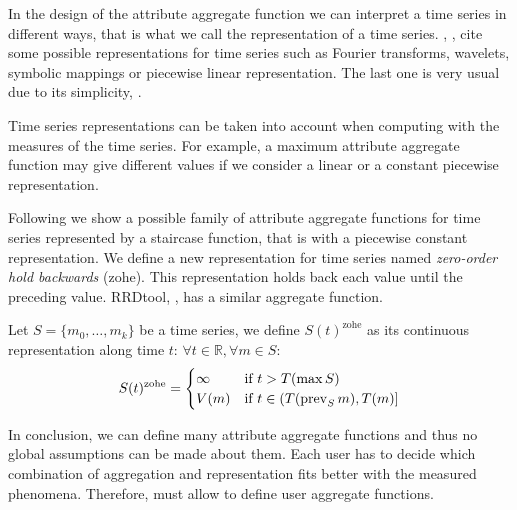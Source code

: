 
In the design of the attribute aggregate function we can interpret a
time series in different ways, that is what we call the representation
of a time series. \citeauthor{last:keogh}, \cite{last:keogh}, cite
some possible representations for time series such as Fourier
transforms, wavelets, symbolic mappings or piecewise linear
representation. The last one is very usual due to its simplicity,
\cite{keogh01}.

Time series representations can be taken into account when computing
with the measures of the time series.  For example, a maximum
attribute aggregate function may give different values if we consider
a linear or a constant piecewise representation.

Following we show a possible family of attribute aggregate functions
for time series represented by a staircase function, that is with a
piecewise constant representation.  We define a new representation for
time series named \emph{zero-order hold backwards} (zohe). This
representation holds back each value until the preceding value. 
RRDtool, \cite{lisa98:oetiker}, has a similar aggregate function.

Let $S=\{m_0,\ldots,m_k\}$ be a time series, we define
$S(t)^{\text{zohe}}$ as its continuous representation along time $t$:
$\forall t \in \mathbb{R} ,\forall m \in S:$
\begin{equation}
 S(t)^{\text{zohe}} =  
\begin{cases}
  \infty & \text{if } t > T(\max S) \\
  V(m)   & \text{if } t\in (T(\operatorname*{prev}_S m),T(m)]
\end{cases}
\label{eq:zohe}
\end{equation}


In conclusion, we can define many attribute aggregate functions and
thus no global assumptions can be made about them. Each user has to
decide which combination of aggregation and representation fits better
with the measured phenomena.  Therefore,  must allow to
define user aggregate functions.









